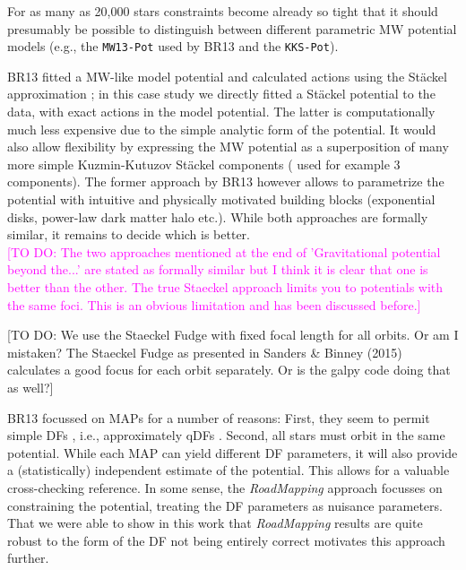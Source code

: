 \documentclass[iop,revtex4]{emulateapj}
\newcommand{\MAP}{MAP}
\newcommand{\MAPs}{MAPs}
\newcommand{\RM}{{\sl RoadMapping}}
\newcommand{\Jo}[1]{\textcolor{YellowOrange}{#1}}
\newcommand{\Wilma}[1]{\textcolor{Magenta}{#1}}
\begin{document}
For as many as 20,000 stars constraints become already so tight that it should presumably be possible to distinguish between different parametric MW potential models (e.g., the \texttt{MW13-Pot} used by BR13 and the \texttt{KKS-Pot}).

BR13 fitted a MW-like model potential and calculated actions using the St\"{a}ckel approximation \citep{2012MNRAS.426.1324B}; in this case study we directly fitted a St\"{a}ckel potential to the data, with exact actions in the model potential. The latter is computationally much less expensive due to the simple analytic form of the potential. It would also allow flexibility by expressing the MW potential as a superposition of many more simple Kuzmin-Kutuzov St\"{a}ckel components (\citet{2003MNRAS.340..752F} used for example 3 components). The former approach by BR13 however allows to parametrize the potential with intuitive and physically motivated building blocks (exponential disks, power-law dark matter halo etc.). While both approaches are formally similar, it remains to decide which is better.\\

\Wilma{[TO DO: The two approaches mentioned at the end of 'Gravitational potential beyond the...' are stated as formally similar but I think it is clear that one is better than the other. The true Staeckel approach limits you to potentials with the same foci. This is an obvious limitation and has been discussed before.]}

\Jo{[TO DO: We use the Staeckel Fudge with fixed focal length for all orbits. Or am I mistaken? The Staeckel Fudge as presented in Sanders \& Binney (2015) calculates a good focus for each orbit separately. Or is the galpy code doing that as well?]}

 BR13 focussed on \MAPs{} for a number of reasons: First, they seem to permit simple DFs \citep{2012ApJ...751..131B,2012ApJ...755..115B,2012ApJ...753..148B}, i.e., approximately qDFs \citep{2013MNRAS.434..652T}. Second, all stars must orbit in the same potential. While each \MAP{} can yield different DF parameters, it will also provide a (statistically) independent estimate of the potential. This allows for a valuable cross-checking reference. In some sense, the \RM{} approach focusses on constraining the potential, treating the DF parameters as nuisance parameters. That we were able to show in this work that \RM{} results are quite robust to the form of the DF not being entirely correct motivates this approach further. 
\end{document}

